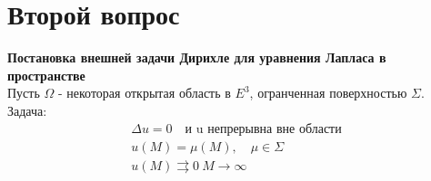 \documentclass[11pt,a4paper, fqlen]{article}
\begin{document}
	
	\section{Второй вопрос}
	\textbf{Постановка внешней задачи Дирихле для уравнения Лапласа в пространстве}\\
	Пусть $\varOmega$ - некоторая открытая область в $E^3$, огранченная поверхностью $\varSigma$. 
	Задача:
	\begin{gather*}
	\Delta u = 0 \quad \text{и u непрерывна вне области} \\
	u(M) = \mu(M), \quad \mu \in \varSigma \\
	u(M) \rightrightarrows 0 \ M \rightarrow \infty 
	\end{gather*} 
\end{document}
